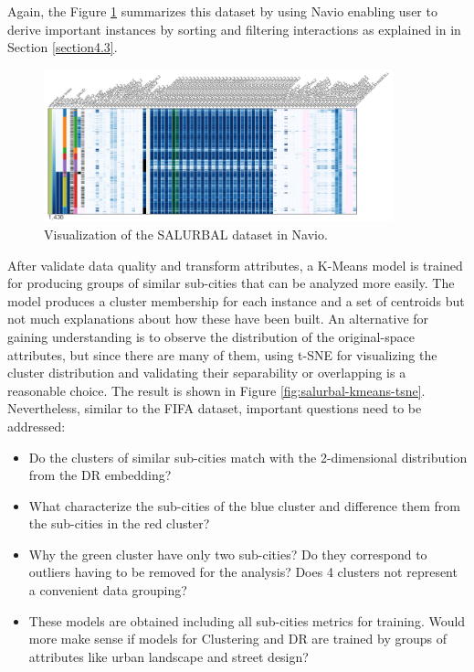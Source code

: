 Again, the Figure \ref{fig:salurbal-navio} summarizes this dataset by using Navio enabling user to derive important instances by sorting and filtering interactions as explained in  in Section \ref{section4.3}.

\begin{figure}[ht]
 \centering
 \includegraphics[width=0.9\textwidth]{salurbal-navio.png}
 \caption{Visualization of the SALURBAL dataset in Navio.}
 \label{fig:salurbal-navio}
\end{figure}

After validate data quality and transform attributes, a K-Means model is trained for producing groups of similar sub-cities that can be analyzed more easily. The model produces a cluster membership for each instance and a set of centroids but not much explanations about how these have been built. An alternative for gaining understanding is to observe the distribution of the original-space attributes, but since there are many of them, using t-SNE for visualizing the cluster distribution and validating their separability or overlapping is a reasonable choice. The result is shown in Figure \ref{fig:salurbal-kmeans-tsne}. Nevertheless, similar to the FIFA dataset, important questions need to be addressed: 

\begin{itemize}
\item Do the clusters of similar sub-cities match with the 2-dimensional distribution from the DR embedding?
\item What characterize the sub-cities of the blue cluster and difference them from the sub-cities in the red cluster?
\item Why the green cluster have only two sub-cities? Do they correspond to outliers having to be removed for the analysis? Does 4 clusters not represent a convenient data grouping?
\item These models are obtained including all sub-cities metrics for training. Would more make sense if models for Clustering and DR are trained by groups of attributes like urban landscape and street design?
\end{itemize}

